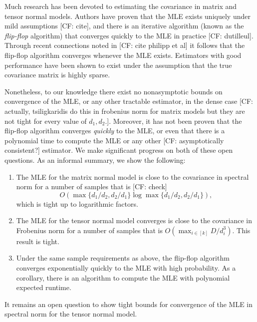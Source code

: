 \documentclass{article}
\newcommand{\CF}[1]{{\color{purple}[CF: #1]}}
\begin{document}
Much research has been devoted to estimating the covariance in matrix and tensor normal models. Authors have proven that the MLE exists uniquely under mild assumptions \CF{cite}, and there is an iterative algorithm (known as the \emph{flip-flop} algorithm) that converges quickly to the MLE in practice \CF{dutilleul}. Through recent connections noted in \CF{cite philipp et al} it follows that the flip-flop algorithm converges whenever the MLE exists. Estimators with good performance have been shown to exist under the assumption that the true covariance matrix is highly sparse.

Nonetheless, to our knowledge there exist no nonasymptotic bounds on convergence of the MLE, or any other tractable estimator, in the dense case \CF{actually, tsiligkaridis do this in frobenius norm for matrix models but they are not tight for every value of $d_1, d_2$.}. Moreover, it has not been proven that the flip-flop algorithm converges \emph{quickly} to the MLE, or even that there is a polynomial time to compute the MLE or any other \CF{asymptotically consistent?} estimator. We make significant progress on both of these open questions. As an informal summary, we show the following:
\begin{enumerate}
\item The MLE for the matrix normal model is close to the covariance in spectral norm for a number of samples that is \CF{check}
$$O(\max \{d_1/d_2, d_2/d_1\} \log \max \{d_1/d_2, d_2/d_1\}),$$ which is tight up to logarithmic factors.
\item The MLE for the tensor normal model converges is close to the covariance in Frobenius norm for a number of samples that is $O(\max_{i \in [k]} D/d_i^3)$. This result is tight.
\item Under the same sample requirements as above, the flip-flop algorithm converges exponentially quickly to the MLE with high probability. As a corollary, there is an algorithm to compute the  MLE with polynomial expected runtime.
\end{enumerate}
It remains an open question to show tight bounds for convergence of the MLE in spectral norm for the tensor normal model.
\end{document}
